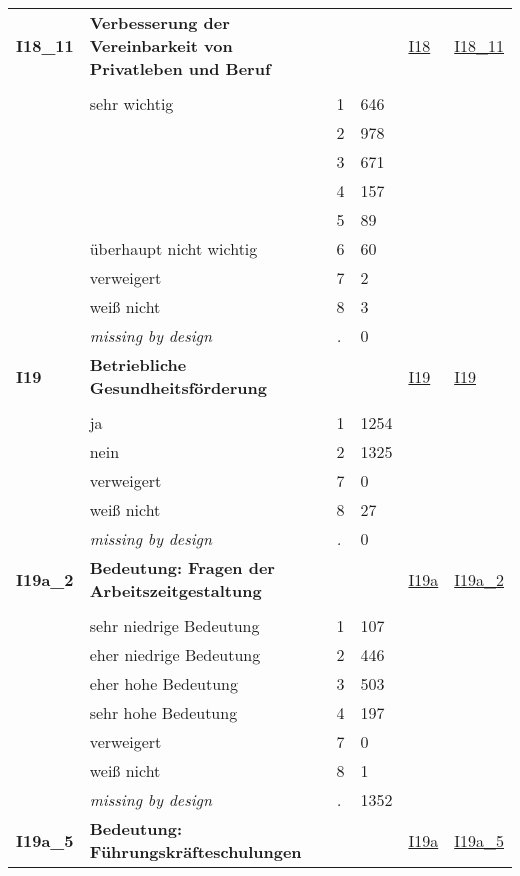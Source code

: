 \begin{longtable}{| L{2.45cm} | L{6cm} | C{1.5cm} | R{1cm} | C{2.25cm} | C{2.25cm} |}
   \midrule
\textbf{I18\_11}\label{var:I18:11} & \textbf{Verbesserung der Vereinbarkeit von Privatleben und Beruf} &  &  & \hyperref[I18]{I18} & \hyperref[var:suf:I18:11]{I18\_11} \\ 
   &  &  &  &  &  \\ 
   & sehr wichtig & 1 & 646 &  &  \\ 
   &  & 2 & 978 &  &  \\ 
   &  & 3 & 671 &  &  \\ 
   &  & 4 & 157 &  &  \\ 
   &  & 5 & 89 &  &  \\ 
   & überhaupt nicht wichtig & 6 & 60 &  &  \\ 
   & verweigert & 7 & 2 &  &  \\ 
   & weiß nicht & 8 & 3 &  &  \\ 
   & \textit{missing by design} & \textit{.} & 0 &  &  \\ 
   \midrule
\textbf{I19}\label{var:I19} & \textbf{Betriebliche Gesundheitsförderung} &  &  & \hyperref[I19]{I19} & \hyperref[var:suf:I19]{I19} \\ 
   &  &  &  &  &  \\ 
   & ja & 1 & 1254 &  &  \\ 
   & nein & 2 & 1325 &  &  \\ 
   & verweigert & 7 & 0 &  &  \\ 
   & weiß nicht & 8 & 27 &  &  \\ 
   & \textit{missing by design} & \textit{.} & 0 &  &  \\ 
   \midrule
\textbf{I19a\_2}\label{var:I19a:2} & \textbf{Bedeutung: Fragen der Arbeitszeitgestaltung} &  &  & \hyperref[I19a]{I19a} & \hyperref[var:suf:I19a:2]{I19a\_2} \\ 
   &  &  &  &  &  \\ 
   & sehr niedrige Bedeutung & 1 & 107 &  &  \\ 
   & eher niedrige Bedeutung & 2 & 446 &  &  \\ 
   & eher hohe Bedeutung & 3 & 503 &  &  \\ 
   & sehr hohe Bedeutung & 4 & 197 &  &  \\ 
   & verweigert & 7 & 0 &  &  \\ 
   & weiß nicht & 8 & 1 &  &  \\ 
   & \textit{missing by design} & \textit{.} & 1352 &  &  \\ 
   \midrule
\textbf{I19a\_5}\label{var:I19a:5} & \textbf{Bedeutung: Führungskräfteschulungen} &  &  & \hyperref[I19a]{I19a} & \hyperref[var:suf:I19a:5]{I19a\_5} \\ 

\end{longtable}
